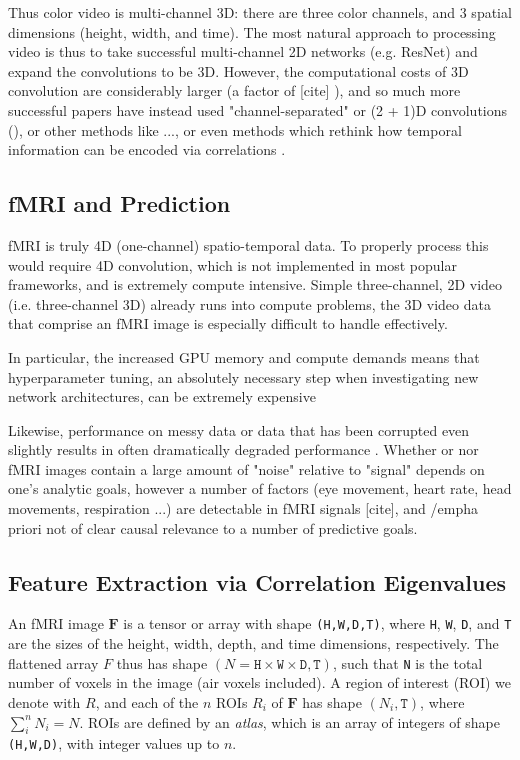 \documentclass[10pt]{article}
\begin{document}
Thus color video is multi-channel 3D: there are three color channels, and 3 spatial dimensions
(height, width, and time). The most natural approach to processing video is thus to take successful
multi-channel 2D networks (e.g. ResNet) and expand the convolutions to be 3D. However, the
computational costs of 3D convolution are considerably larger (a factor of [cite]
\citet{tranCloserLookSpatiotemporal2018}), and so much more successful papers have instead used
"channel-separated" or (2 + 1)D convolutions (\citet{tranCloserLookSpatiotemporal2018}), or other
methods like ..., or even methods which rethink how temporal information can be encoded via
correlations \cite{wangVideoModelingCorrelation2020}.

\subsection{fMRI and Prediction}

fMRI is truly 4D (one-channel) spatio-temporal data. To properly process this would require 4D
convolution, which is not implemented in most popular frameworks, and is extremely compute
intensive. Simple three-channel, 2D video (i.e. three-channel 3D) already runs into compute
problems, the 3D video data that comprise an fMRI image is especially difficult to handle
effectively.

In particular, the increased GPU memory and compute demands means that hyperparameter tuning, an
absolutely necessary step when investigating new network architectures, can be extremely expensive


Likewise, performance on messy data or data that has been corrupted even slightly results in often
dramatically degraded performance
\citep{metzUsingLearnedOptimizers2019,dodgeStudyComparisonHuman2017,hendrycksBenchmarkingNeuralNetwork2019,azulayWhyDeepConvolutional2019,rosenfeldElephantRoom2018}.
Whether or nor fMRI images contain a large amount of "noise" relative to "signal" depends on one's
analytic goals, however a number of factors (eye movement, heart rate, head movements, respiration
...) are detectable in fMRI signals [cite], and /emph{a priori} not of clear causal relevance to a
number of predictive goals.


\subsection{Feature Extraction via Correlation Eigenvalues}

An fMRI image \(\bm{F}\) is a tensor or array with shape \texttt{(H,W,D,T)}, where \texttt{H},
\texttt{W}, \texttt{D}, and \texttt{T} are the sizes of the height, width, depth, and time
dimensions, respectively. The flattened array \(F\) thus has shape \((N = \texttt{H} \times
\texttt{W} \times \texttt{D}, \texttt{T})\), such that \texttt{N} is the total number of voxels in
the image (air voxels included). A region of interest (ROI) we denote with \(R\), and each of the
\(n\) ROIs \(R_i\) of \(\bm{F}\) has shape \((N_i, \texttt{T})\), where \(\sum_i^n N_i= N\). ROIs
are defined by an \emph{atlas}, which is an array of integers of shape \texttt{(H,W,D)}, with
integer values up to \(n\).
\end{document}
